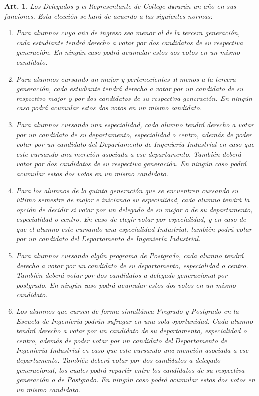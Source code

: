\documentclass[letterpaper,11pt]{article}
\theoremstyle{plain}
\newtheorem{art}{Art.} %
\begin{document}
		\begin{art}\label{definicionesDelegados}
			Los Delegados y el Representante de College durarán un año en sus funciones. Esta elección se hará de acuerdo a las siguientes normas:
			\begin{enumerate}
				\item Para alumnos cuyo año de ingreso sea menor al de la tercera generación, cada estudiante tendrá derecho a votar por dos candidatos de su respectiva generación. En ningún caso podrá acumular estos dos votos en un mismo candidato.
				\item Para alumnos cursando un major y pertenecientes al menos a la tercera generación, cada estudiante tendrá derecho a votar por un candidato de su respectivo major y por dos candidatos de su respectiva generación. En ningún caso podrá acumular estos dos votos en un mismo candidato.
				\item Para alumnos cursando una especialidad, cada alumno tendrá derecho a votar por un candidato de su departamento, especialidad o centro, además de poder votar por un candidato del Departamento de Ingeniería Industrial en caso que este cursando una mención asociada a ese departamento. También deberá votar por dos candidatos de su respectiva generación. En ningún caso podrá acumular estos dos votos en un mismo candidato.
				\item Para los alumnos de la quinta generación que se encuentren cursando su último semestre de major e iniciando su especialidad, cada alumno tendrá la opción de decidir si votar por un delegado de su major o de su departamento, especialidad o centro. En caso de elegir votar por especialidad, y en caso de que el alumno este cursando una especialidad Industrial, también podrá votar por un candidato del Departamento de Ingeniería Industrial.
				\item Para alumnos cursando algún programa de Postgrado, cada alumno tendrá derecho a votar por un candidato de su departamento, especialidad o centro. También deberá votar por dos candidatos a delegado generacional por postgrado. En ningún caso podrá acumular estos dos votos en un mismo candidato.
				\item Los alumnos que cursen de forma simultánea Pregrado y Postgrado en la Escuela de Ingeniería podrán sufragar en una sola oportunidad. Cada alumno tendrá derecho a votar por un candidato de su departamento, especialidad o centro, además de poder votar por un candidato del Departamento de Ingeniería Industrial en caso que este cursando una mención asociada a ese departamento. También deberá votar por dos candidatos a delegado generacional, los cuales podrá repartir entre los candidatos de su respectiva generación o de Postgrado. En ningún caso podrá acumular estos dos votos en un mismo candidato.

\end{enumerate}
\end{art}
\end{document}
